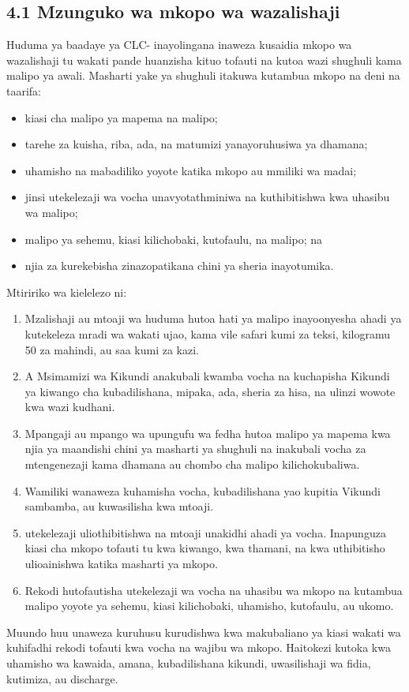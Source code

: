 \documentclass[11pt]{article}
\begin{document}
\subsection*{4.1 Mzunguko wa mkopo wa wazalishaji}

Huduma ya baadaye ya CLC- inayolingana inaweza kusaidia mkopo wa wazalishaji tu wakati pande huanzisha kituo tofauti na kutoa wazi shughuli kama malipo ya awali. Masharti yake ya shughuli itakuwa kutambua mkopo na deni na taarifa:

\begin{itemize}[leftmargin=*]
\item kiasi cha malipo ya mapema na malipo;
\item tarehe za kuisha, riba, ada, na matumizi yanayoruhusiwa ya dhamana;
\item uhamisho na mabadiliko yoyote katika mkopo au mmiliki wa madai;
\item jinsi utekelezaji wa vocha unavyotathminiwa na kuthibitishwa kwa uhasibu wa malipo;
\item malipo ya sehemu, kiasi kilichobaki, kutofaulu, na malipo; na
\item njia za kurekebisha zinazopatikana chini ya sheria inayotumika.
\end{itemize}
Mtiririko wa kielelezo ni:

\begin{enumerate}[leftmargin=*]
\item Mzalishaji au mtoaji wa huduma hutoa hati ya malipo inayoonyesha ahadi ya kutekeleza mradi wa wakati ujao, kama vile safari kumi za teksi, kilogramu 50 za mahindi, au saa kumi za kazi.
\item A Msimamizi wa Kikundi anakubali kwamba vocha na kuchapisha Kikundi ya kiwango cha kubadilishana, mipaka, ada, sheria za hisa, na ulinzi wowote kwa wazi kudhani.
\item Mpangaji au mpango wa upungufu wa fedha hutoa malipo ya mapema kwa njia ya maandishi chini ya masharti ya shughuli na inakubali vocha za mtengenezaji kama dhamana au chombo cha malipo kilichokubaliwa.
\item Wamiliki wanaweza kuhamisha vocha, kubadilishana yao kupitia Vikundi sambamba, au kuwasilisha kwa mtoaji.
\item utekelezaji uliothibitishwa na mtoaji unakidhi ahadi ya vocha. Inapunguza kiasi cha mkopo tofauti tu kwa kiwango, kwa thamani, na kwa uthibitisho ulioainishwa katika masharti ya mkopo.
\item Rekodi hutofautisha utekelezaji wa vocha na uhasibu wa mkopo na kutambua malipo yoyote ya sehemu, kiasi kilichobaki, uhamisho, kutofaulu, au ukomo.
\end{enumerate}
Muundo huu unaweza kuruhusu kurudishwa kwa makubaliano ya kiasi wakati wa kuhifadhi rekodi tofauti kwa vocha na wajibu wa mkopo. Haitokezi kutoka kwa uhamisho wa kawaida, amana, kubadilishana kikundi, uwasilishaji wa fidia, kutimiza, au discharge.
\end{document}
